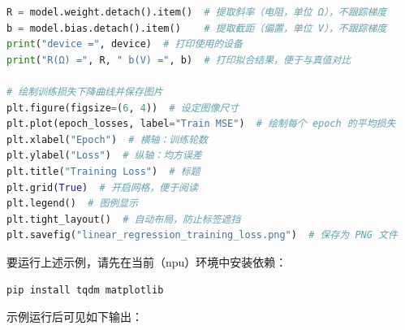 \begin{lstlisting}[language=Python]
R = model.weight.detach().item()  # 提取斜率（电阻，单位 Ω），不跟踪梯度
b = model.bias.detach().item()    # 提取截距（偏置，单位 V），不跟踪梯度
print("device =", device)  # 打印使用的设备
print("R(Ω) =", R, " b(V) =", b)  # 打印拟合结果，便于与真值对比

# 绘制训练损失下降曲线并保存图片
plt.figure(figsize=(6, 4))  # 设定图像尺寸
plt.plot(epoch_losses, label="Train MSE")  # 绘制每个 epoch 的平均损失
plt.xlabel("Epoch")  # 横轴：训练轮数
plt.ylabel("Loss")  # 纵轴：均方误差
plt.title("Training Loss")  # 标题
plt.grid(True)  # 开启网格，便于阅读
plt.legend()  # 图例显示
plt.tight_layout()  # 自动布局，防止标签遮挡
plt.savefig("linear_regression_training_loss.png")  # 保存为 PNG 文件
\end{lstlisting}

要运行上述示例，请先在当前（npu）环境中安装依赖：

\begin{lstlisting}[language=bash]
pip install tqdm matplotlib
\end{lstlisting}

示例运行后可见如下输出：

